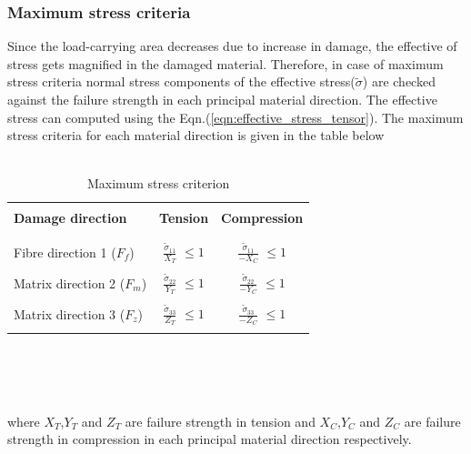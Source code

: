 \documentclass[a4paper,14pt]{extarticle}
\begin{document}
\subsubsection{Maximum stress criteria}
\indent\indent\indent Since the load-carrying area decreases due to increase in damage, the effective of stress gets magnified in the damaged material. Therefore, in case of maximum stress criteria normal stress components of the effective stress($\tilde{\sigma}$) are checked against the failure strength in each principal material direction. The effective stress can computed using the Eqn.(\ref{eqn:effective_stress_tensor}). The maximum stress criteria for each material direction is given in the table below
\\
\\
\begin{table}[h!]
  \begin{center}
     \begin{tabular}{l  c  c} 
     \hline
     \\
      \textbf{Damage direction} \;\;& \textbf{Tension} \;& \textbf{Compression}\\
      \\
      \hline
      \\
      Fibre direction 1 ($F_{f}$) & \Large{$\frac{\tilde{\sigma}_{11}}{X_{T}} $}\small{ $\leq 1$} & \Large{$\frac{\tilde{\sigma}_{11}}{-X_{C}} $}\small{ $\leq 1$} \\
      \\
      Matrix direction 2 ($F_{m}$)  &  \Large{$\frac{\tilde{\sigma}_{22}}{Y_{T}} $}\small{ $\leq 1$}  & \Large{$\frac{\tilde{\sigma}_{22}}{-Y_{C}} $}\small{ $\leq 1$}\\
      \\
      Matrix direction 3 ($F_{z}$) &  \Large{$\frac{\tilde{\sigma}_{33}}{Z_{T}} $}\small{ $\leq 1$}  &   \Large{$\frac{\tilde{\sigma}_{33}}{-Z_{C}} $}\small{ $\leq 1$}\\
       \\
       \hline
    \end{tabular}
    \\
    \caption{Maximum stress criterion}
    \label{tab:Maximum stress criterion}
  \end{center}
\end{table}\\
\\
where $X_{T}$,$ Y_{T} $ and $Z_{T}$ are failure strength in tension and $X_{C}$,$ Y_{C} $ and $Z_{C}$ are failure strength in compression in each principal material direction respectively.\\
\\
\end{document}
